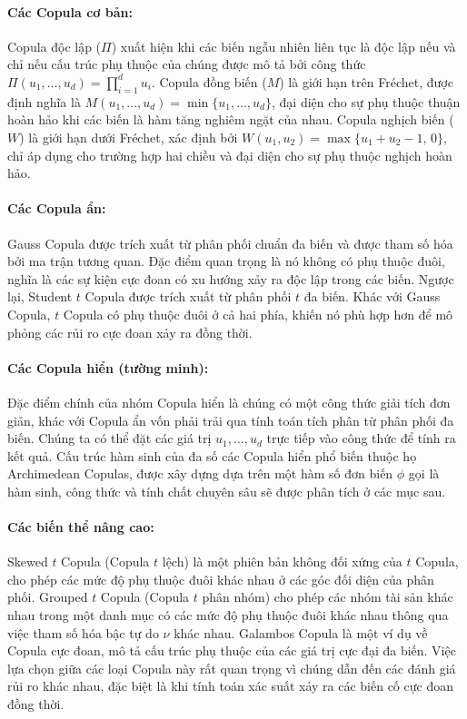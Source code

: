 \paragraph{Các Copula cơ bản:}
Copula độc lập ($\Pi$) xuất hiện khi các biến ngẫu nhiên liên tục là độc lập nếu và chỉ nếu cấu trúc phụ thuộc của chúng được mô tả bởi công thức $ \Pi(u_1, \dots, u_d) = \prod_{i=1}^{d} u_i $. Copula đồng biến ($M$) là giới hạn trên Fréchet, được định nghĩa là $M(u_1, \dots, u_d) = \min\{u_1, \dots, u_d\}$, đại diện cho sự phụ thuộc thuận hoàn hảo khi các biến là hàm tăng nghiêm ngặt của nhau. Copula nghịch biến ($W$) là giới hạn dưới Fréchet, xác định bởi $W(u_1, u_2) = \max\{u_1 + u_2 - 1, \, 0\}$, chỉ áp dụng cho trường hợp hai chiều và đại diện cho sự phụ thuộc nghịch hoàn hảo.

\paragraph{Các Copula ẩn:}
Gauss Copula được trích xuất từ phân phối chuẩn đa biến và được tham số hóa bởi ma trận tương quan. Đặc điểm quan trọng là nó không có phụ thuộc đuôi, nghĩa là các sự kiện cực đoan có xu hướng xảy ra độc lập trong các biến. Ngược lại, Student $t$ Copula được trích xuất từ phân phối $t$ đa biến. Khác với Gauss Copula, $t$ Copula có phụ thuộc đuôi ở cả hai phía, khiến nó phù hợp hơn để mô phỏng các rủi ro cực đoan xảy ra đồng thời.

\paragraph{Các Copula hiển (tường minh):}
Đặc điểm chính của nhóm Copula hiển là chúng có một công thức giải tích đơn giản, khác với Copula ẩn vốn phải trải qua tính toán tích phân từ phân phối đa biến. Chúng ta có thể đặt các giá trị $u_1, \dots, u_d$ trực tiếp vào công thức để tính ra kết quả. Cấu trúc hàm sinh của đa số các Copula hiển phổ biến thuộc họ Archimedean Copulas, được xây dựng dựa trên một hàm số đơn biến $\phi$ gọi là hàm sinh, công thức và tính chất chuyên sâu sẽ được phân tích ở các mục sau.

\paragraph{Các biến thể nâng cao:}
Skewed $t$ Copula (Copula $t$ lệch) là một phiên bản không đối xứng của $t$ Copula, cho phép các mức độ phụ thuộc đuôi khác nhau ở các góc đối diện của phân phối. Grouped $t$ Copula (Copula $t$ phân nhóm) cho phép các nhóm tài sản khác nhau trong một danh mục có các mức độ phụ thuộc đuôi khác nhau thông qua việc tham số hóa bậc tự do $\nu$ khác nhau. Galambos Copula là một ví dụ về Copula cực đoan, mô tả cấu trúc phụ thuộc của các giá trị cực đại đa biến. Việc lựa chọn giữa các loại Copula này rất quan trọng vì chúng dẫn đến các đánh giá rủi ro khác nhau, đặc biệt là khi tính toán xác suất xảy ra các biến cố cực đoan đồng thời.
